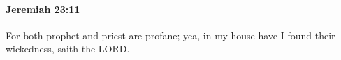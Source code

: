 
		\paragraph{Jeremiah 23:11} %
			\label{JEREMIAH-23-11}

			For both prophet and priest are profane; yea, in my house have I found their wickedness, saith the LORD.


